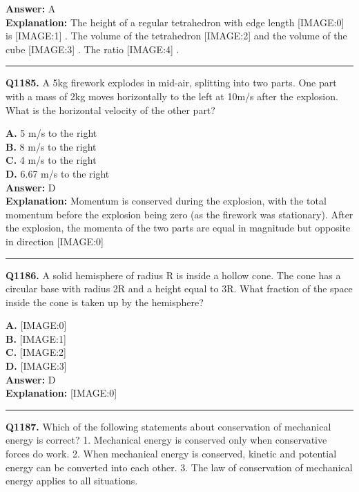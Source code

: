 \documentclass[12pt]{article}
\begin{document}
\textbf{Answer:} A \\
\textbf{Explanation:} The height of a regular tetrahedron with edge length
[IMAGE:0]
is
[IMAGE:1]
. The volume of the tetrahedron
[IMAGE:2]
and the volume of the cube
[IMAGE:3]
. The ratio
[IMAGE:4]
.

\hrule
\vspace{1em}


\noindent
\textbf{Q1185.} A 5kg firework explodes in mid-air, splitting into two parts. One part with a mass of 2kg moves horizontally to the left at 10m/s after the explosion. What is the horizontal velocity of the other part?



\textbf{A.} 5 m/s to the right \\
\textbf{B.} 8 m/s to the right \\
\textbf{C.} 4 m/s to the right \\
\textbf{D.} 6.67 m/s to the right \\

\textbf{Answer:} D \\
\textbf{Explanation:} Momentum is conserved during the explosion, with the total momentum before the explosion being zero (as the firework was stationary). After the explosion, the momenta of the two parts are equal in magnitude but opposite in direction
[IMAGE:0]

\hrule
\vspace{1em}


\noindent
\textbf{Q1186.} A solid hemisphere of radius R is inside a hollow cone. The cone has a circular base with radius 2R and a height equal to 3R. What fraction of the space inside the cone is taken up by the hemisphere?



\textbf{A.} [IMAGE:0] \\
\textbf{B.} [IMAGE:1] \\
\textbf{C.} [IMAGE:2] \\
\textbf{D.} [IMAGE:3] \\

\textbf{Answer:} D \\
\textbf{Explanation:} [IMAGE:0]

\hrule
\vspace{1em}


\noindent
\textbf{Q1187.} Which of the following statements about conservation of mechanical energy is correct?
1.
Mechanical energy is conserved only when conservative forces do work.
2.
When mechanical energy is conserved, kinetic and potential energy can be converted into each other.
3.
The law of conservation of mechanical energy applies to all situations.
\end{document}

